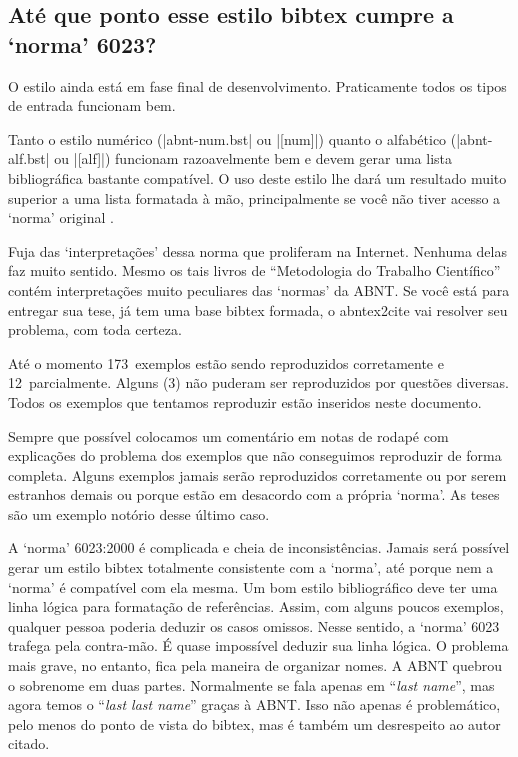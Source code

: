 \documentclass[a4paper]{ltxdoc}
\newcommand{\OKs}{173}
\newcommand{\quaseOKs}{12}
\newcommand{\nadaOK}{3}
\begin{document}
\subsection{Até que ponto esse estilo \textsf{bibtex} cumpre a `norma' 6023?}

O estilo ainda está em fase final de desenvolvimento. Praticamente
todos os tipos de entrada funcionam bem.

Tanto o estilo numérico (|abnt-num.bst| ou |[num]|) quanto o alfabético
(|abnt-alf.bst| ou |[alf]|) funcionam razoavelmente bem e devem
gerar uma lista bibliográfica bastante compatível. O uso deste estilo lhe dará
um resultado muito superior a uma lista formatada à mão, principalmente se você
não tiver acesso a `norma' original \cite{NBR6023:2000}.

Fuja das `interpretações' dessa norma que proliferam na Internet. Nenhuma delas
faz muito sentido. Mesmo os tais livros de ``Metodologia do Trabalho
Científico'' contém interpretações muito peculiares das `normas' da ABNT.
Se você está para entregar sua tese, já tem uma base \textsf{bibtex} formada,
o \textsf{abntex2cite} vai resolver seu problema, com toda certeza.

Até o momento \OKs\ exemplos estão sendo reproduzidos corretamente e \quaseOKs\
parcialmente. Alguns (\nadaOK) não puderam ser reproduzidos por questões
diversas. Todos os exemplos que tentamos reproduzir estão inseridos neste
documento.

Sempre que possível colocamos um comentário em notas de rodapé com explicações
do problema dos exemplos que não conseguimos reproduzir de forma completa.
Alguns exemplos jamais serão reproduzidos corretamente ou por serem estranhos
demais ou porque estão em desacordo com a própria `norma'. As teses são um
exemplo notório desse último caso.

A `norma' 6023:2000 \cite{NBR6023:2000} é complicada e cheia de inconsistências.
Jamais será possível gerar um estilo \textsf{bibtex} totalmente consistente com
a `norma', até porque nem a `norma' é compatível com ela mesma. Um bom estilo bibliográfico
deve ter uma linha lógica para formatação de referências. Assim, com alguns
poucos exemplos, qualquer pessoa poderia deduzir os casos omissos. Nesse
sentido, a `norma' 6023 trafega pela contra-mão. É quase impossível deduzir sua
linha lógica. O problema mais grave, no entanto, fica pela maneira de organizar
nomes. A ABNT quebrou o sobrenome em duas partes. Normalmente se fala apenas em
``\textit{last name}'', mas agora temos o ``\textit{last last name}'' graças à
ABNT. Isso não apenas é problemático, pelo menos do ponto de vista do
\textsf{bibtex}, mas é também um desrespeito ao autor citado.
\end{document}
